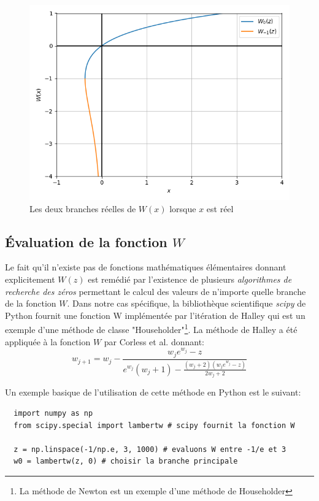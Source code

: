 \begin{figure} 
  \begin{center}
    \includegraphics[width=.6\textwidth]{resources/lambertw.png}
    \caption{Les deux branches réelles de $W(x)$ lorsque $x$ est réel}
    \label{fig:lambertw}
  \end{center}
\end{figure}

\subsection{Évaluation de la fonction $W$}

Le fait qu'il n'existe pas de fonctions mathématiques élémentaires donnant explicitement $W(z)$ est remédié par l'existence de plusieurs \textit{algorithmes de recherche des zéros} permettant le calcul des valeurs de n'importe quelle branche de la fonction $W$. Dans notre cas spécifique, la bibliothèque scientifique \textit{scipy} de Python fournit une fonction W implémentée par l'itération de Halley qui est un exemple d'une méthode de classe "Householder"\footnote{La méthode de Newton est un exemple d'une méthode de Householder}. La méthode de Halley a été appliquée à la fonction $W$  par Corless et al. \cite{Corless1996} donnant:
\begin{equation}
  \label{eq:halley}
  w_{j+1} = w_j - \frac{w_j e^{w_j} - z}{e^{w_j}(w_j + 1) - \frac{(w_j + 2)(w_j e^{w_j} - z)}{2w_j + 2}}
\end{equation}

Un exemple basique de l'utilisation de cette méthode en Python est le suivant:\\

\noindent
\begin{minipage}{\linewidth}
\begin{verbatim}
  import numpy as np 
  from scipy.special import lambertw # scipy fournit la fonction W

  z = np.linspace(-1/np.e, 3, 1000) # evaluons W entre -1/e et 3
  w0 = lambertw(z, 0) # choisir la branche principale
\end{verbatim}
\end{minipage}

